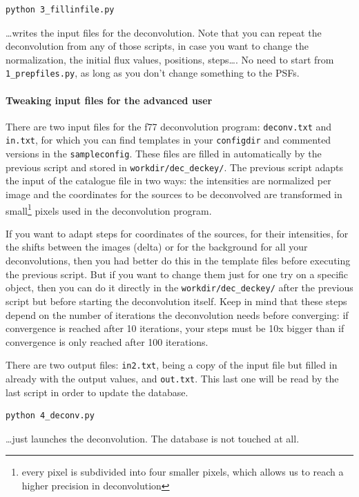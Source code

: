 \begin{Verbatim}
python 3_fillinfile.py
\end{Verbatim}

\ldots writes the input files for the deconvolution. Note that you can repeat the deconvolution from any of those scripts, in case you want to change the normalization, the initial flux values, positions, steps\ldots. No need to start from \verb+1_prepfiles.py+, as long as you don't change something to the PSFs.

\paragraph{Tweaking input files for the advanced user}

There are two input files for the f77 deconvolution program: \verb+deconv.txt+ and \verb+in.txt+, for which you can find templates in your \verb+configdir+ and commented versions in the \verb+sampleconfig+. These files are filled in automatically by the previous script and stored in \verb+workdir/dec_deckey/+. The previous script adapts the input of the catalogue file in two ways: the intensities are normalized per image and the coordinates for the sources to be deconvolved are transformed in small\footnote{every pixel is subdivided into four smaller pixels, which allows us to reach a higher precision in deconvolution} pixels used in the deconvolution program. 

If you want to adapt steps for coordinates of the sources, for their intensities, for the shifts between the images (delta) or for the background for all your deconvolutions, then you had better do this in the template files before executing the previous script. But if you want to change them just for one try on a specific object, then you can do it directly in the \verb+workdir/dec_deckey/+ after the previous script but before starting the deconvolution itself.
Keep in mind that these steps depend on the number of iterations the deconvolution needs before converging: if convergence is reached after 10 iterations, your steps must be 10x bigger than if convergence is only reached after 100 iterations.

There are two output files: \verb+in2.txt+, being a copy of the input file but filled in already with the output values, and \verb+out.txt+. This last one will be read by the last script in order to update the database.


\begin{Verbatim}
python 4_deconv.py
\end{Verbatim}
\ldots just launches the deconvolution. The database is not touched at all.


